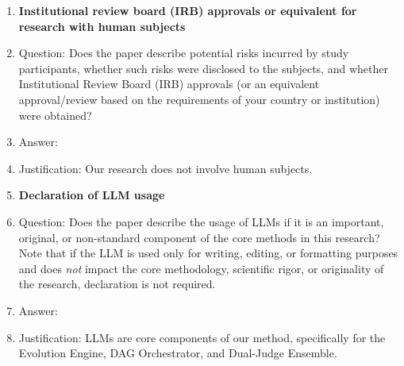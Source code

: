\begin{enumerate}
\item {\bf Institutional review board (IRB) approvals or equivalent for research with human subjects}
    \item[] Question: Does the paper describe potential risks incurred by study participants, whether such risks were disclosed to the subjects, and whether Institutional Review Board (IRB) approvals (or an equivalent approval/review based on the requirements of your country or institution) were obtained?
    \item[] Answer: \answerNA{} 
    \item[] Justification: Our research does not involve human subjects.

\item {\bf Declaration of LLM usage}
    \item[] Question: Does the paper describe the usage of LLMs if it is an important, original, or non-standard component of the core methods in this research? Note that if the LLM is used only for writing, editing, or formatting purposes and does \emph{not} impact the core methodology, scientific rigor, or originality of the research, declaration is not required.
    \item[] Answer: \answerYes{} 
    \item[] Justification: LLMs are core components of our method, specifically for the Evolution Engine, DAG Orchestrator, and Dual-Judge Ensemble.

\end{enumerate}
